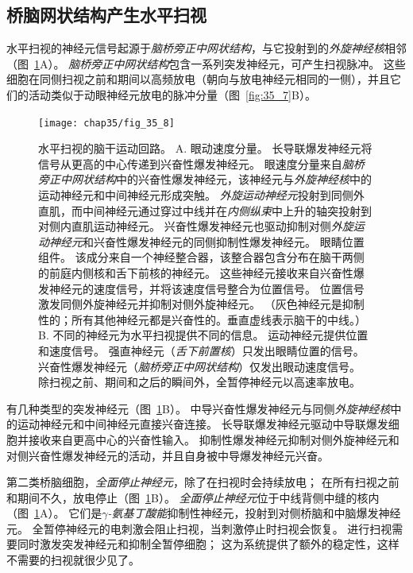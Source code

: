 \subsection{桥脑网状结构产生水平扫视}

水平扫视的神经元信号起源于\textit{脑桥旁正中网状结构}，与它投射到的\textit{外旋神经核}相邻（图~\ref{fig:35_8}A）。
\textit{脑桥旁正中网状结构}包含一系列突发神经元，可产生扫视脉冲。
这些细胞在同侧扫视之前和期间以高频放电（朝向与放电神经元相同的一侧），并且它们的活动类似于动眼神经元放电的脉冲分量（图~\ref{fig:35_7}B）。


\begin{figure}[htbp]
	\centering
	\texttt{[image: chap35/fig\_35\_8]}
	\caption{水平扫视的脑干运动回路。 
		A. 眼动速度分量。
		长导联爆发神经元将信号从更高的中心传递到兴奋性爆发神经元。
		眼速度分量来自\textit{脑桥旁正中网状结构}中的兴奋性爆发神经元，该神经元与\textit{外旋神经核}中的运动神经元和中间神经元形成突触。
		\textit{外旋运动神经元}投射到同侧外直肌，而中间神经元通过穿过中线并在\textit{内侧纵束}中上升的轴突投射到对侧内直肌运动神经元。
		兴奋性爆发神经元也驱动抑制对侧\textit{外旋运动神经元}和兴奋性爆发神经元的同侧抑制性爆发神经元。
		眼睛位置组件。
		该成分来自一个神经整合器，该整合器包含分布在脑干两侧的前庭内侧核和舌下前核的神经元。
		这些神经元接收来自兴奋性爆发神经元的速度信号，并将该速度信号整合为位置信号。
		位置信号激发同侧外旋神经元并抑制对侧外旋神经元。 （灰色神经元是抑制性的；所有其他神经元都是兴奋性的。垂直虚线表示脑干的中线。）
		B. 不同的神经元为水平扫视提供不同的信息。
		运动神经元提供位置和速度信号。
		强直神经元（\textit{舌下前置核}）只发出眼睛位置的信号。
		兴奋性爆发神经元（\textit{脑桥旁正中网状结构}）仅发出眼动速度信号。
		除扫视之前、期间和之后的瞬间外，全暂停神经元以高速率放电。}
	\label{fig:35_8}
\end{figure}


有几种类型的突发神经元（图~\ref{fig:35_8}B）。
中导兴奋性爆发神经元与同侧\textit{外旋神经核}中的运动神经元和中间神经元直接兴奋连接。
长导联爆发神经元驱动中导联爆发细胞并接收来自更高中心的兴奋性输入。
抑制性爆发神经元抑制对侧外旋神经元和对侧兴奋性爆发神经元的活动，并且自身被中导爆发神经元兴奋。


第二类桥脑细胞，\textit{全面停止神经元}，除了在扫视时会持续放电；
在所有扫视之前和期间不久，放电停止（图~\ref{fig:35_8}B）。
\textit{全面停止神经元}位于中线背侧中缝的核内（图~\ref{fig:35_8}A）。
它们是\textit{$ \gamma $-氨基丁酸能}抑制性神经元，投射到对侧桥脑和中脑爆发神经元。
全暂停神经元的电刺激会阻止扫视，当刺激停止时扫视会恢复。
进行扫视需要同时激发突发神经元和抑制全暂停细胞；
这为系统提供了额外的稳定性，这样不需要的扫视就很少见了。



